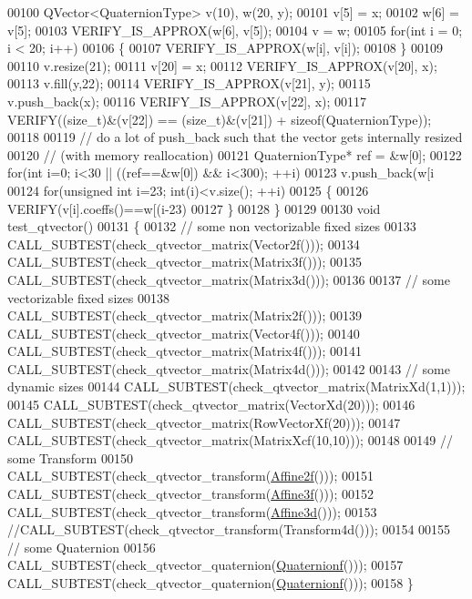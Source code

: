 \begin{DoxyCode}
00100   QVector<QuaternionType> v(10), w(20, y);
00101   v[5] = x;
00102   w[6] = v[5];
00103   VERIFY\_IS\_APPROX(w[6], v[5]);
00104   v = w;
00105   \textcolor{keywordflow}{for}(\textcolor{keywordtype}{int} i = 0; i < 20; i++)
00106   \{
00107     VERIFY\_IS\_APPROX(w[i], v[i]);
00108   \}
00109 
00110   v.resize(21);
00111   v[20] = x;
00112   VERIFY\_IS\_APPROX(v[20], x);
00113   v.fill(y,22);
00114   VERIFY\_IS\_APPROX(v[21], y);
00115   v.push\_back(x);
00116   VERIFY\_IS\_APPROX(v[22], x);
00117   VERIFY((\textcolor{keywordtype}{size\_t})&(v[22]) == (\textcolor{keywordtype}{size\_t})&(v[21]) + \textcolor{keyword}{sizeof}(QuaternionType));
00118 
00119   \textcolor{comment}{// do a lot of push\_back such that the vector gets internally resized}
00120   \textcolor{comment}{// (with memory reallocation)}
00121   QuaternionType* ref = &w[0];
00122   \textcolor{keywordflow}{for}(\textcolor{keywordtype}{int} i=0; i<30 || ((ref==&w[0]) && i<300); ++i)
00123     v.push\_back(w[i%
00124   \textcolor{keywordflow}{for}(\textcolor{keywordtype}{unsigned} \textcolor{keywordtype}{int} i=23; int(i)<v.size(); ++i)
00125   \{
00126     VERIFY(v[i].coeffs()==w[(i-23)%
00127   \}
00128 \}
00129 
00130 \textcolor{keywordtype}{void} test\_qtvector()
00131 \{
00132   \textcolor{comment}{// some non vectorizable fixed sizes}
00133   CALL\_SUBTEST(check\_qtvector\_matrix(Vector2f()));
00134   CALL\_SUBTEST(check\_qtvector\_matrix(Matrix3f()));
00135   CALL\_SUBTEST(check\_qtvector\_matrix(Matrix3d()));
00136 
00137   \textcolor{comment}{// some vectorizable fixed sizes}
00138   CALL\_SUBTEST(check\_qtvector\_matrix(Matrix2f()));
00139   CALL\_SUBTEST(check\_qtvector\_matrix(Vector4f()));
00140   CALL\_SUBTEST(check\_qtvector\_matrix(Matrix4f()));
00141   CALL\_SUBTEST(check\_qtvector\_matrix(Matrix4d()));
00142 
00143   \textcolor{comment}{// some dynamic sizes}
00144   CALL\_SUBTEST(check\_qtvector\_matrix(MatrixXd(1,1)));
00145   CALL\_SUBTEST(check\_qtvector\_matrix(VectorXd(20)));
00146   CALL\_SUBTEST(check\_qtvector\_matrix(RowVectorXf(20)));
00147   CALL\_SUBTEST(check\_qtvector\_matrix(MatrixXcf(10,10)));
00148 
00149   \textcolor{comment}{// some Transform}
00150   CALL\_SUBTEST(check\_qtvector\_transform(\hyperlink{group___geometry___module_ga2c1ea05a21899654ee3a2e3f91fa30e0}{Affine2f}()));
00151   CALL\_SUBTEST(check\_qtvector\_transform(\hyperlink{group___geometry___module_ga17e901de8ff882aea7845c5457db6a4f}{Affine3f}()));
00152   CALL\_SUBTEST(check\_qtvector\_transform(\hyperlink{group___geometry___module_gaaffa69d3143826efeb84e5d6c56a4c78}{Affine3d}()));
00153   \textcolor{comment}{//CALL\_SUBTEST(check\_qtvector\_transform(Transform4d()));}
00154 
00155   \textcolor{comment}{// some Quaternion}
00156   CALL\_SUBTEST(check\_qtvector\_quaternion(\hyperlink{group___geometry___module_ga785b13a5a87f9bf55d4eba51ead2dcf0}{Quaternionf}()));
00157   CALL\_SUBTEST(check\_qtvector\_quaternion(\hyperlink{group___geometry___module_ga785b13a5a87f9bf55d4eba51ead2dcf0}{Quaternionf}()));
00158 \}
\end{DoxyCode}
